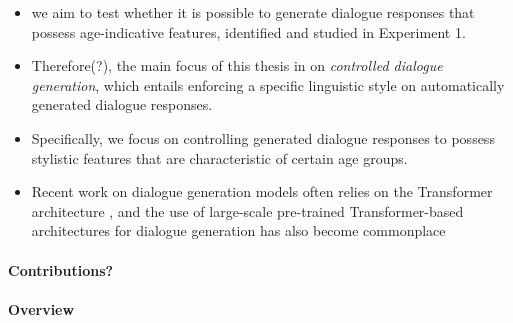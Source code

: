 \begin{itemize}
    \item we aim to test whether it is possible to generate dialogue responses that possess age-indicative features, identified and studied in Experiment 1.
    \item  Therefore(?), the main focus of this thesis in on \textit{controlled dialogue generation}, which entails enforcing a specific linguistic style on automatically generated dialogue responses.
    \item Specifically, we focus on controlling generated dialogue responses to possess stylistic features that are characteristic of certain age groups.
    \item Recent work on dialogue generation models often relies on the Transformer architecture \citep{vaswani2017attention}, and the use of large-scale pre-trained Transformer-based architectures for dialogue generation has also become commonplace \citep{zhang2019dialogpt, brown2020language-models-few-shot-gpt3}
\end{itemize}

\paragraph{Contributions?}

\paragraph{Overview}



